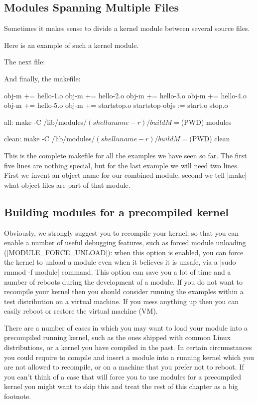 \documentclass[10pt, oneside]{book}
\begin{document}
\subsection{Modules Spanning Multiple Files}
\label{modfiles}
Sometimes it makes sense to divide a kernel module between several source files.

Here is an example of such a kernel module.

The next file:

And finally, the makefile:

\begin{code}
obj-m += hello-1.o
obj-m += hello-2.o
obj-m += hello-3.o
obj-m += hello-4.o
obj-m += hello-5.o
obj-m += startstop.o
startstop-objs := start.o stop.o

all:
	make -C /lib/modules/$(shell uname -r)/build M=$(PWD) modules

clean:
	make -C /lib/modules/$(shell uname -r)/build M=$(PWD) clean
\end{code}

This is the complete makefile for all the examples we have seen so far.
The first five lines are nothing special, but for the last example we will need two lines.
First we invent an object name for our combined module, second we tell \sh|make| what object files are part of that module.

\subsection{Building modules for a precompiled kernel}
\label{precompiled}
Obviously, we strongly suggest you to recompile your kernel, so that you can enable a number of useful debugging features, such as forced module unloading (\cpp|MODULE_FORCE_UNLOAD|): when this option is enabled, you can force the kernel to unload a module even when it believes it is unsafe, via a \sh|sudo rmmod -f module| command.
This option can save you a lot of time and a number of reboots during the development of a module.
If you do not want to recompile your kernel then you should consider running the examples within a test distribution on a virtual machine.
If you mess anything up then you can easily reboot or restore the virtual machine (VM).

There are a number of cases in which you may want to load your module into a precompiled running kernel, such as the ones shipped with common Linux distributions, or a kernel you have compiled in the past.
In certain circumstances you could require to compile and insert a module into a running kernel which you are not allowed to recompile, or on a machine that you prefer not to reboot.
If you can't think of a case that will force you to use modules for a precompiled kernel you might want to skip this and treat the rest of this chapter as a big footnote.
\end{document}
